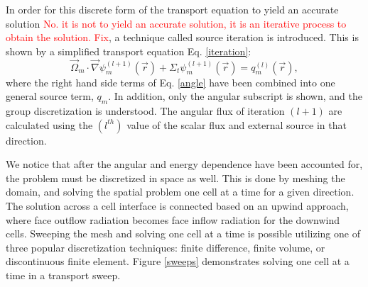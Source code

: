 \documentclass[11pt, letterpaper,titlepage,oneside]{article}
\newcommand{\tcr}[1]{\textcolor{red}{#1}}
\newcommand{\vr}{\vec{r}}
\newcommand{\vo}{\vec{\Omega}}
\begin{document}
In order for this discrete form of the transport equation to yield an accurate solution \tcr{No. it is not to yield an accurate solution, it
is an iterative process to obtain the solution. Fix}, a technique called source iteration is introduced. This is shown by a simplified transport equation Eq. \ref{iteration}:
\begin{equation}
\vo_m \cdot \vec\nabla \psi_m^{(l+1)}(\vr) + \Sigma_t \psi_m^{(l+1)}(\vr) = q_m^{(l)}(\vr),
\label{iteration}
\end{equation}
where the right hand side terms of Eq. \ref{angle} have been combined into one general source term, $q_m$. In addition, only the angular subscript is shown, and the group discretization is understood. The angular flux of iteration $(l+1)$ are calculated using the $(l^{th})$ value of the scalar flux and external source in that direction. 

We notice that after the angular and energy dependence have been accounted for, the problem must be discretized in space as well. This is done by meshing the domain, and solving the spatial problem one cell at a time for a given direction. The solution across a cell interface is connected based on an upwind approach, where face outflow radiation becomes face inflow radiation for the downwind cells. Sweeping the mesh and solving one cell at a time is possible utilizing one of three popular discretization techniques: finite difference\cite{fd}, finite volume\cite{fv}, or discontinuous finite element\cite{Reed}. Figure \ref{sweeps} demonstrates solving one cell at a time in a transport sweep. 
\end{document}
